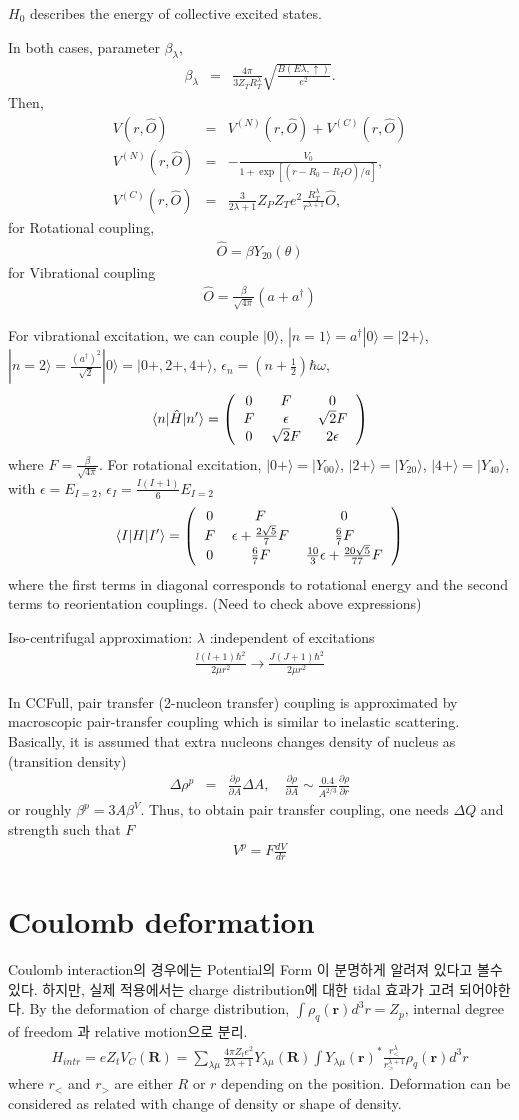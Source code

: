 \documentclass[11pt]{book}
\def\bm{\boldsymbol}
\def\vr{{\bm r}}
\def\vR{{\bm R}}
\def\la{\langle}
\def\ra{\rangle}
\newcommand{\bea}{\begin{eqnarray}}
\newcommand{\eea}{\end{eqnarray}}
\newcommand{\no}{\nonumber \\}
\newcommand{\del}{\partial}
\newcommand{\threeDmat}[9]{\left(\begin{tabular}{ccc}
		{$#1$}&{$#2$}&{$#3$}\\
		{$#4$}&{$#5$}&{$#6$}\\
		{$#7$}&{$#8$}&{$#9$}\end{tabular}\right)}
\begin{document}
$H_0$ describes the energy of collective excited states.

In both cases, parameter $\beta_\lambda$,
\bea
\beta_\lambda&=&\frac{4\pi}{3Z_T R_T^\lambda}\sqrt{\frac{B(E\lambda,\uparrow)}{e^2}}.
\eea 
Then,
\bea 
V(r,\hat{O}) &=& V^{(N)}(r,\hat{O})+V^{(C)}(r,\hat{O}) \no 
V^{(N)}(r,\hat{O})&=& -\frac{V_0}{1+\exp[(r-R_0-R_T\hat{O})/a]},\no 
V^{(C)}(r,\hat{O})&=&\frac{3}{2\lambda+1}Z_P Z_T e^2 \frac{R_T^\lambda}{r^{\lambda+1}}\hat{O}, 
\eea 
for Rotational coupling,
\bea 
\hat{O}=\beta Y_{20}(\theta)
\eea 
for Vibrational coupling
\bea 
\hat{O}=\frac{\beta}{\sqrt{4\pi}}(a+a^\dagger)
\eea 

For vibrational excitation, we can couple 
$|0\ra$, $|n=1\ra=a^\dagger|0\ra=|2+\ra$,
$|n=2\ra=\frac{(a^\dagger)^2}{\sqrt{2}}|0\ra= |0+,2+,4+\ra$, $\epsilon_n=(n+\frac{1}{2})\hbar\omega$,
\bea 
\la n|\hat{H}|n'\ra = \threeDmat{0}{F}{0}{F}{\epsilon}{\sqrt{2}F}{0}{\sqrt{2}F}{2\epsilon}
\eea 
where $F=\frac{\beta}{\sqrt{4\pi}}$.	
For rotational excitation,
$|0+\ra=|Y_{00}\ra$, $|2+\ra=|Y_{20}\ra$, $|4+\ra=|Y_{40}\ra$,
with $\epsilon= E_{I=2}$, $\epsilon_{I}=\frac{I(I+1)}{6}E_{I=2}$
\bea 
\la I|H|I'\ra = \threeDmat{0}{F}{0}
    {F}{\epsilon+\frac{2\sqrt{5}}{7}F }{\frac{6}{7}F}
	{0}{\frac{6}{7}F}{\frac{10}{3}\epsilon+\frac{20\sqrt{5}}{77}F}
\eea 
where the first terms in diagonal corresponds to rotational 
energy and the second terms to reorientation couplings. 
(Need to check above expressions)


Iso-centrifugal approximation: $\lambda$ :independent of excitations 
\bea 
\frac{l(l+1)\hbar^2}{2\mu r^2}\to \frac{J(J+1)\hbar^2}{2\mu r^2}
\eea 

In CCFull, pair transfer (2-nucleon transfer) coupling is approximated by 
macroscopic pair-transfer coupling which is similar to inelastic scattering. 
Basically, it is assumed that extra nucleons changes density of nucleus as
(transition density)
\bea 
\Delta \rho^p &=& \frac{\del\rho}{\del A}\Delta A,\quad 
\frac{\del\rho}{\del A}\sim \frac{0.4}{A^{2/3}}\frac{\del \rho}{\del r}
\eea  
or roughly $\beta^p=3A \beta^V$.
Thus, to obtain pair transfer coupling,
one needs $\Delta Q$ and strength such that $F$
\bea 
V^p = F\frac{d V}{dr}
\eea 

\section{Coulomb deformation}
Coulomb interaction의 경우에는 Potential의 Form 이 분명하게 알려져 있다고 볼수 있다.
하지만, 실제 적용에서는 charge distribution에 대한 tidal 효과가 고려 되어야한다. 
By the deformation of charge distribution, 
$\int \rho_q(\vr) d^3 r=Z_p$, internal degree of freedom 과 relative motion으로 분리.  
\bea 
H_{intr}= e Z_t V_C(\vR)
       =\sum_{\lambda\mu}\frac{4\pi Z_t e^2}{2\lambda+1} Y_{\lambda\mu}(\vR)
        \int Y_{\lambda\mu}(\vr)^* \frac{r_{<}^\lambda}{r_{>}^{\lambda+1}}
        \rho_q(\vr)      d^3 r
\eea 
where $r_{<}$ and $r_{>}$ are either $R$ or $r$ depending on the position.
Deformation can be considered as related with change of density or shape of density. 
\end{document}
